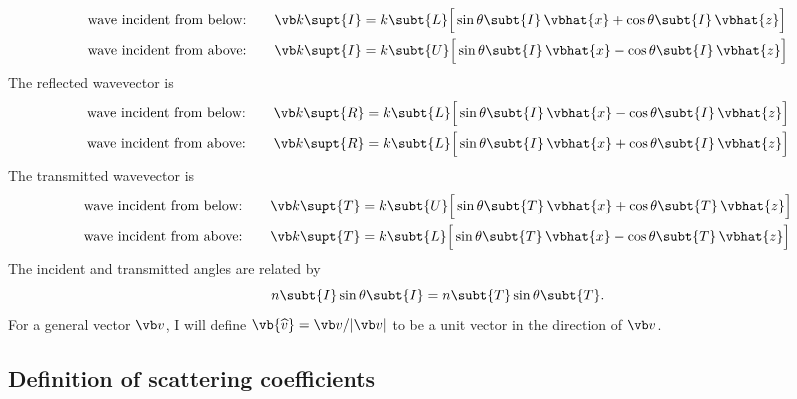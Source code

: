 \documentclass[letterpaper]{article}
\newcommand{\vbwhat}[1]{\vb{\widehat{#1}}}
\begin{document}
\begin{align*}
 \text{wave incident from below:} 
  \qquad &\vb k\supt{I}= k\subt{L}\Big[ \sin\theta\subt{I}\,\vbhat{x} + \cos\theta\subt{I}\,\vbhat{z}\Big]
\\
 \text{wave incident from above:} 
  \qquad &\vb k\supt{I}= k\subt{U}\Big[ \sin\theta\subt{I}\,\vbhat{x} - \cos\theta\subt{I}\,\vbhat{z}\Big]
\end{align*}
The reflected wavevector is 
\begin{align*}
 \text{wave incident from below:} 
  \qquad &\vb k\supt{R}= k\subt{L}\Big[ \sin\theta\subt{I}\,\vbhat{x} - \cos\theta\subt{I}\,\vbhat{z}\Big]
\\
 \text{wave incident from above:} 
  \qquad &\vb k\supt{R}= k\subt{L}\Big[ \sin\theta\subt{I}\,\vbhat{x} + \cos\theta\subt{I}\,\vbhat{z}\Big]
\end{align*}
The transmitted wavevector is 
\begin{align*}
 \text{wave incident from below:}
  \qquad &\vb k\supt{T}= k\subt{U}\Big[ \sin\theta\subt{T}\,\vbhat{x} + \cos\theta\subt{T}\,\vbhat{z}\Big]
\\
 \text{wave incident from above:} 
  \qquad &\vb k\supt{T}= k\subt{L}\Big[ \sin\theta\subt{T}\,\vbhat{x} - \cos\theta\subt{T}\,\vbhat{z}\Big]
\end{align*}
The incident and transmitted angles are related by 
$$ n\subt{I}\sin\theta\subt{I} = n\subt{T}\sin\theta\subt{T}.$$
For a general vector $\vb v$, I will define $\vbwhat{v}=\vb v/|\vb v|$ 
to be a unit vector in the direction of $\vb v$.

\subsection*{Definition of scattering coefficients}
\end{document}
